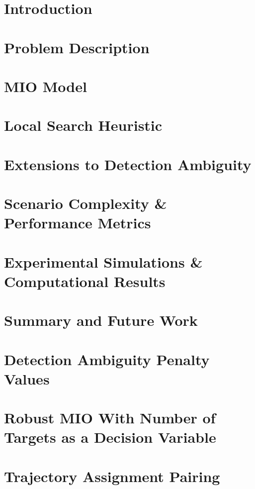 \documentclass[12pt,twoside,leftblank]{mitthesis}
\begin{document}

\pagestyle{plain}


\chapter{Introduction}\label{ch: Intro}


\chapter{Problem Description}\label{ch:Problem Description}


\chapter{MIO Model}\label{ch:Basic MIO Model}


\chapter{Local Search Heuristic}\label{ch:Heuristic}


\chapter{Extensions to Detection Ambiguity}\label{ch:Robust MIO Model}


\chapter{Scenario Complexity \& Performance Metrics} \label{ch:Scenario-Performance}

 
\chapter{Experimental Simulations \& Computational Results}\label{ch:Results}


\chapter{Summary and Future Work}\label{ch:Conclusion}


\appendix

\chapter{Detection Ambiguity Penalty Values}\label{app:Penalty_Appendix}


\chapter{Robust MIO With Number of Targets as a Decision Variable}\label{app:Robust_Appendix}


\chapter{Trajectory Assignment Pairing}\label{app:Assignment_Appendix}



\end{document}
